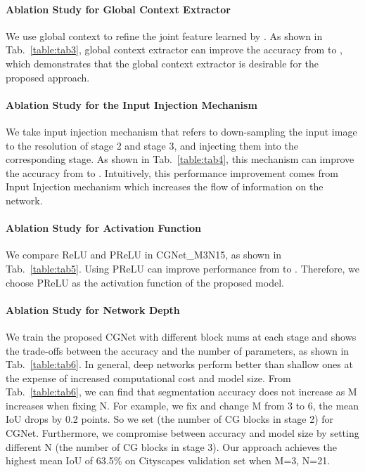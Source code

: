 \documentclass[10pt,twocolumn,letterpaper]{article}
\begin{document}
\paragraph{Ablation Study for Global Context Extractor }
We use global context to refine the joint feature learned by . As shown in  Tab.~\ref{table:tab3}, global context extractor can improve the accuracy from  to , which demonstrates that the global context extractor  is desirable for the proposed approach.

\vspace{-10pt}
\paragraph{Ablation Study for the Input Injection Mechanism }
We take input injection mechanism that refers to down-sampling the input image to the resolution of stage 2 and stage 3, and injecting them into the corresponding stage.
As shown in Tab.~\ref{table:tab4}, this mechanism can improve the accuracy from  to . Intuitively, this performance improvement comes from Input Injection mechanism which increases the flow of information on the network.


\vspace{-10pt}
\paragraph{Ablation Study for Activation Function }
We compare ReLU and PReLU in CGNet\_M3N15, as shown in  Tab.~\ref{table:tab5}. Using PReLU can improve performance from  to . Therefore, we choose PReLU as the activation function of the proposed model.


\paragraph{Ablation Study for Network Depth}
We train the proposed CGNet with different block nums at each stage and shows the trade-offs between the accuracy and the number of parameters, as shown in Tab.~\ref{table:tab6}. In general, deep networks perform better than shallow ones at the expense of increased computational cost and model size. From Tab.~\ref{table:tab6}, we can find that segmentation accuracy does not increase as M increases when fixing N. For example, we fix  and change M from 3 to 6, the mean IoU drops by 0.2 points. So we set  (the number of CG blocks in stage 2) for CGNet. Furthermore, we compromise between accuracy and model size by setting different N (the number of CG blocks in stage 3). Our approach achieves the highest mean IoU of 63.5\% on Cityscapes validation set when M=3, N=21.
\end{document}
